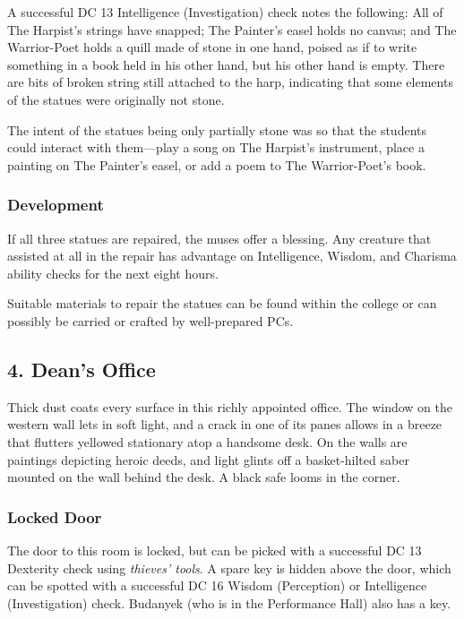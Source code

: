\documentclass[10pt,a4paper,twoside,bg=print,twocolumn,openany,nodeprecatedcode]{dndbook}
\begin{document}
A successful DC 13 Intelligence (Investigation) check notes the following: All of The Harpist's strings have snapped; The Painter's easel holds no canvas; and The Warrior-Poet holds a quill made of stone in one hand, poised as if to write something in a book held in his other hand, but his other hand is empty. There are bits of broken string still attached to the harp, indicating that some elements of the statues were originally not stone.

The intent of the statues being only partially stone was so that the students could interact with them—play a song on The Harpist's instrument, place a painting on The Painter's easel, or add a poem to The Warrior-Poet's book.

\subsubsection{Development}
If all three statues are repaired, the muses offer a blessing. Any creature that assisted at all in the repair has advantage on Intelligence, Wisdom, and Charisma ability checks for the next eight hours.

Suitable materials to repair the statues can be found within the college or can possibly be carried or crafted by well-prepared PCs.

\subsection{4. Dean's Office}
\begin{DndReadAloud}{}
Thick dust coats every surface in this richly appointed office. The window on the western wall lets in soft light, and a crack in one of its panes allows in a breeze that flutters yellowed stationary atop a handsome desk. On the walls are paintings depicting heroic deeds, and light glints off a basket-hilted saber mounted on the wall behind the desk. A black safe looms in the corner.

\end{DndReadAloud}

\subsubsection{Locked Door}
The door to this room is locked, but can be picked with a successful DC 13 Dexterity check using \textit{thieves' tools}. A spare key is hidden above the door, which can be spotted with a successful DC 16 Wisdom (Perception) or Intelligence (Investigation) check. Budanyek (who is in the Performance Hall) also has a key.
\end{document}
